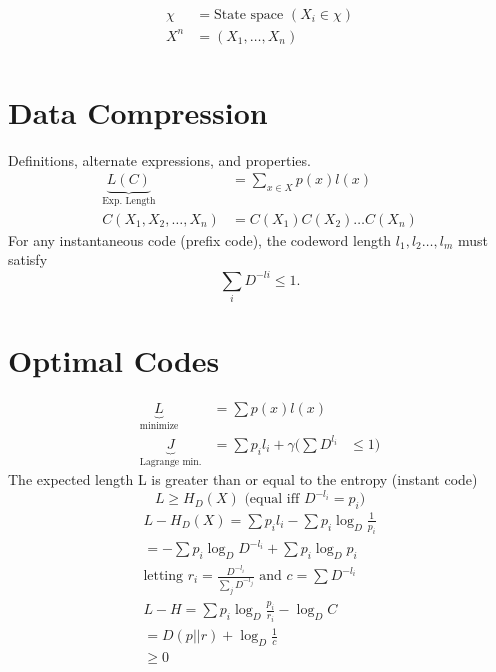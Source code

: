 \documentclass[10pt]{article}
\begin{document}
\begin{tiny}
\begin{multicols}{3}
\begin{align*}
\chi &= \text{State space } (X_i \in \chi) \\
X^n &=(X_1,\ldots,X_n) \\
\end{align*}


\section*{Data Compression}
Definitions, alternate expressions, and properties.
\begin{align}
    \underbrace{L(C)}_\text{Exp. Length}&= \sum_{x\in X} p(x)l(x) \label{defn: Exp. Length}\\
C(X_1,X_2,\ldots,X_n) &= C(X_1)C(X_2)\ldots C(X_n)
\end{align}
 \label{thm: kraft}
For any instantaneous code (prefix code), the codeword length $l_1,l_2 \ldots , l_m$ must satisfy
\begin{equation}
\sum_i D^{-li}  \leq 1.
\end{equation}
\section*{Optimal Codes}
\begin{align}
\underbrace{L}_\text{minimize}&= \sum p(x)l(x) \label{defn: minimize}\\
\underbrace{J}_\text{Lagrange min.}&= \sum {p_i}{l_i} + \gamma (\sum D^{l_i}&\leq 1) \label{defn: lagrange}
\end{align}
 \label{thm: codewordentropy}
The expected length L is greater than or equal to the entropy (instant code)
\begin{equation}
L \geq H_D(X) \text{ (equal iff } D^{-l_i} = p_i \text{)}
\end{equation}
\begin{eqnarray}
L - H_D(X) = \sum {p_i}{l_i} - \sum {p_i} \log_D \frac {1}{p_i}\\
= - \sum {p_i} \log_D D^{-l_i} + \sum {p_i} \log_D {p_i} \\
\text{letting } {r_i} = \frac {D^{-l_i}}{\sum_j D^{-l_j}} \text{ and } c = \sum D^{-l_i} \\
L - H = \sum {p_i} \log_D \frac {p_i}{r_i} - \log_D C \\
= D(p||r) + \log_D \frac {1}{c} \\
\geq 0 
\end{eqnarray}


\end{multicols}
\end{tiny}
\end{document}

